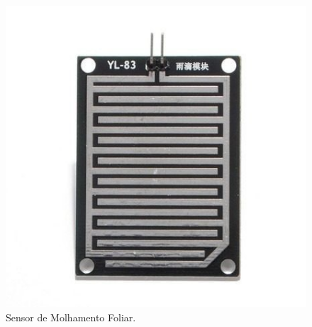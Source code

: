 \begin{figure}[H]
\centering
\includegraphics[scale=0.35]{./04-figuras/molhamento.jpg}
\caption{Sensor de Molhamento Foliar.}
\vspace{-\baselineskip}
\label{fig:molhamento}
\end{figure}




